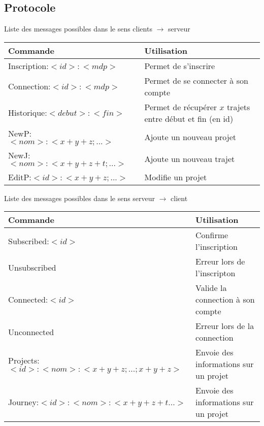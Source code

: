 \documentclass[a4paper, 11pt]{report}
\begin{document}
\subsection{Protocole}
	\begin{center}
		Liste des messages possibles dans le sens clients $\rightarrow$ serveur
		\par
		\begin{tabular}{|l|l|}
			\hline
			Commande & Utilisation\\
			\hline
			Inscription:$<id>:<mdp>$ & Permet de s'inscrire\\
			\hline
			Connection:$<id>:<mdp>$ & Permet de se connecter à son compte\\
			\hline
			\hline
			Historique:$<debut>:<fin>$ & Permet de récupérer $x$ trajets entre début et fin (en id)\\
			\hline
			NewP:$<nom>:<x+y+z;...>$ & Ajoute un nouveau projet\\
			\hline
			NewJ:$<nom>:<x+y+z+t;...>$ & Ajoute un nouveau trajet\\
			\hline
			EditP:$<id>:<x+y+z;...>$ & Modifie un projet\\
			\hline
		\end{tabular}
	\end{center}
	\begin{center}
		Liste des messages possibles dans le sens serveur $\rightarrow$ client
		\par
		\begin{tabular}{|l|l|}
			\hline
			Commande & Utilisation\\
			\hline
			Subscribed:$<id>$ & Confirme l'inscription \\
			\hline
			Unsubscribed & Erreur lors de l'inscripton \\
			\hline
			Connected:$<id>$ & Valide la connection à son compte\\
			\hline
			Unconnected & Erreur lors de la connection \\
			\hline
			\hline
			Projects:$<id>:<nom>:<x+y+z;...;x+y+z>$ & Envoie des informations sur un projet\\
			\hline
			Journey:$<id>:<nom>:<x+y+z+t...>$ & Envoie des informations sur un projet\\
			\hline
		\end{tabular}
	\end{center}
\end{document}
